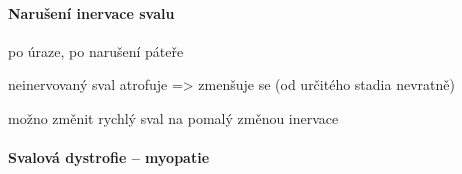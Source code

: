 \documentclass[DIV=8]{scrreprt}
\begin{document}
\paragraph{Narušení inervace svalu}
\begin{myItemize}[nosep]
    \item po úraze, po narušení páteře
    \item neinervovaný sval atrofuje => zmenšuje se (od určitého stadia nevratně)
    \item možno změnit rychlý sval na pomalý změnou inervace
\end{myItemize}



\paragraph{Svalová dystrofie – myopatie}
\end{document}
